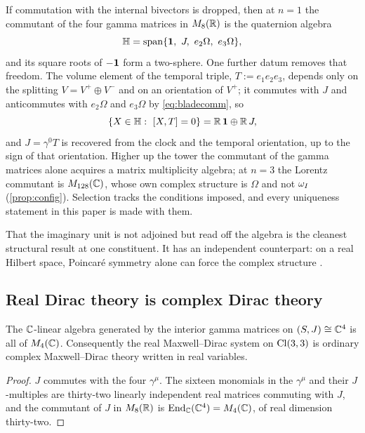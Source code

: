 \begin{remark}
\label{rem:ambient}
If commutation with the internal bivectors is dropped, then at $n=1$ the commutant of the four gamma matrices in $M_8(\mathbb{R})$ is the
quaternion algebra
\[
\HH=\operatorname{span}\{\id,\ J,\ e_2\Omega,\ e_3\Omega\},
\]
and its square roots of $-\mathbf 1$ form a two-sphere. One further datum removes that freedom. The volume element of the temporal triple,
$T:=e_1e_2e_3$, depends only on the splitting $V=V^+\oplus V^-$ and on an orientation of $V^+$; it commutes with $J$ and anticommutes
with $e_2\Omega$ and $e_3\Omega$ by \eqref{eq:bladecomm}, so
\[
\{X\in\mathbb{H}:\ [X,T]=0\}=\mathbb{R}\,\mathbf 1\oplus\mathbb{R}\,J ,
\]
and $J=\gamma^0T$ is recovered from the clock and the temporal orientation, up to the sign of that orientation. Higher up the
tower the commutant of the gamma matrices alone acquires a matrix multiplicity algebra; at $n=3$ the Lorentz commutant is
$M_{128}(\mathbb{C})$, whose own complex structure is $\Omega$ and not $\omega_I$ (\cref{prop:config}). Selection tracks the conditions imposed,
and every uniqueness statement in this paper is made with them.
\end{remark}

That the imaginary unit is not adjoined but read off the algebra is the cleanest structural result at one constituent. It has an
independent counterpart: on a real Hilbert space, Poincar\'e symmetry alone can force the complex structure \cite{MorettiOppio}.

\subsection{Real Dirac theory is complex Dirac theory}

\begin{theorem}
\label{thm:realification}
The $\mathbb{C}$-linear algebra generated by the interior gamma matrices on $(S,J)\cong\mathbb{C}^4$ is all of $M_4(\mathbb{C})$. Consequently the real
Maxwell--Dirac system on $\mathrm{Cl}(3,3)$ is ordinary complex Maxwell--Dirac theory written in real variables.
\end{theorem}

\begin{proof}
$J$ commutes with the four $\gamma^\mu$. The sixteen monomials in the $\gamma^\mu$ and their $J$-multiples are thirty-two
linearly independent real matrices commuting with $J$, and the commutant of $J$ in $M_8(\mathbb{R})$ is $\operatorname{End}_{\mathbb{C}}(\mathbb{C}^4)=M_4(\mathbb{C})$, of real
dimension thirty-two.
\end{proof}

